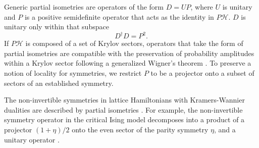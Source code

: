 \documentclass[
 reprint,
 amsmath,amssymb,
 aps,floatfix,prl,superscriptaddress
]{revtex4-2}
\begin{document}
Generic partial isometries \cite{Ortiz:2025psr, Giridhar:2025bol} are operators of the form $D = UP$, where $U$ is unitary and  $P$ is a positive semidefinite operator that acts as the identity in $P\mathcal{H}$. $D$ is unitary only within that subspace
\begin{equation}
    D^\dagger D = P^2.
\end{equation}
If $P\mathcal{H}$ is composed of a set of Krylov sectors, operators that take the form of partial isometries are compatible with the preservation of probability amplitudes within a Krylov sector following a generalized Wigner's theorem \cite{Ortiz:2025psr}. 
To preserve a notion of locality for symmetries, we restrict $P$ to be a projector onto a subset of sectors of an established symmetry.

The non-invertible symmetries in lattice Hamiltonians with Kramers-Wannier dualities are described by partial isometries \cite{Ortiz:2025psr, Giridhar:2025bol, Shao:2023gho, Zhu:2025ktk, Seiberg:2023cdc,Seiberg:2024gek}.
For example, the non-invertible symmetry operator in the critical Ising model decomposes into a product of a projector $(1+\eta)/2$ onto the even sector of the parity symmetry $\eta$, and a unitary operator \cite{Seiberg:2024gek}.
\end{document}

